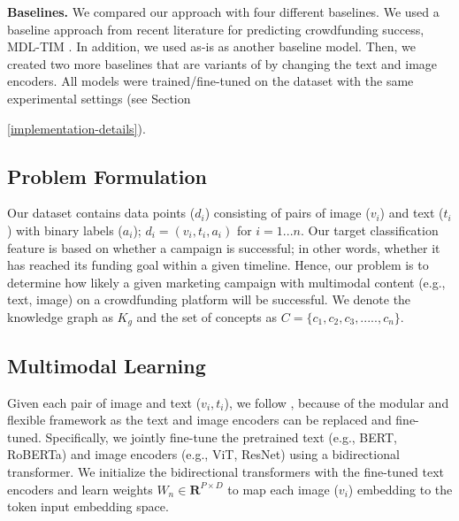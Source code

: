 \noindent\textbf{Baselines.} We compared our approach with four different baselines. We used a baseline approach from recent literature for predicting crowdfunding success, MDL-TIM \cite{cheng2019success}. In addition, we used \cite{kiela2020supervised} as-is as another baseline model. Then, we created two more baselines that are variants of \cite{kiela2020supervised} by changing the text and image encoders. 
All models were trained/fine-tuned on the dataset with the same experimental settings (see Section {\ref{implementation-details}).

\vspace{-2mm}
\subsection{Problem Formulation}
\vspace{-1mm}
Our dataset contains data points  ($d_i$) consisting of pairs of image ($v_i$) and text ($t_i$) with binary labels ($a_i$); $d_i = {(v_i,t_i,a_i)}$ for $i=1...n$.
Our target classification feature is %
based on whether a campaign is successful; in other words, whether it has reached its funding goal within a given timeline.
Hence, our problem is to determine how likely a given marketing campaign with multimodal content (e.g., text, image) on a crowdfunding platform will be successful.
We denote the knowledge graph as $K_g$ and the set of concepts as $C = {\{c_1, c_2, c_3, ....., c_n\}}$.


\vspace{-2mm}
\subsection{Multimodal Learning}
\label{mmbt-kil-model}
\vspace{-1mm}
Given each pair of image and text ($v_i,t_i$), we follow \cite{kiela2020supervised}, 
because of the modular and flexible framework as the text and image encoders can be replaced and fine-tuned. Specifically, we jointly fine-tune the pretrained text (e.g., BERT, RoBERTa) and image encoders (e.g., ViT, ResNet) 
using a bidirectional transformer. We initialize the bidirectional transformers with the fine-tuned text encoders and learn weights $W_n \in \mathbf{R}^{P\times D}$ to map each image ($v_i$) embedding to the token input embedding space. 

}
